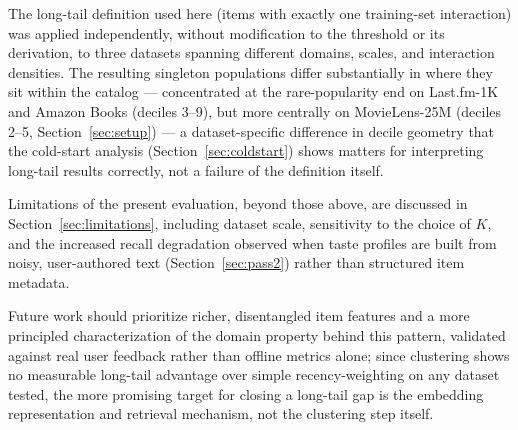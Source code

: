 \documentclass[11pt,a4paper]{article}
\begin{document}
The long-tail definition used here (items with exactly one training-set
interaction) was applied independently, without modification to the
threshold or its derivation, to three datasets spanning different domains,
scales, and interaction densities. The resulting singleton populations
differ substantially in where they sit within the catalog --- concentrated
at the rare-popularity end on Last.fm-1K and Amazon Books (deciles 3--9),
but more centrally on MovieLens-25M (deciles 2--5, Section~\ref{sec:setup}) ---
a dataset-specific difference in decile geometry that the cold-start
analysis (Section~\ref{sec:coldstart}) shows matters for interpreting
long-tail results correctly, not a failure of the definition itself.

Limitations of the present evaluation, beyond those above, are discussed in
Section~\ref{sec:limitations}, including dataset scale, sensitivity to the
choice of $K$, and the increased recall degradation observed when taste
profiles are built from noisy, user-authored text (Section~\ref{sec:pass2})
rather than structured item metadata.

Future work should prioritize richer, disentangled item features and a
more principled characterization of the domain property behind this
pattern, validated against real user feedback rather than offline metrics
alone; since clustering shows no measurable long-tail advantage over
simple recency-weighting on any dataset tested, the more promising target
for closing a long-tail gap is the embedding representation and retrieval
mechanism, not the clustering step itself.
\end{document}
